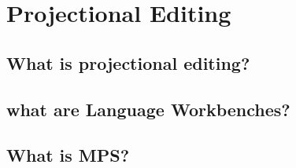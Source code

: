 \section{Projectional Editing}\label{chapter:projectional_editing}
\subsection{What is projectional editing?}

\subsection{what are Language Workbenches?}

\subsection{What is MPS?}









 